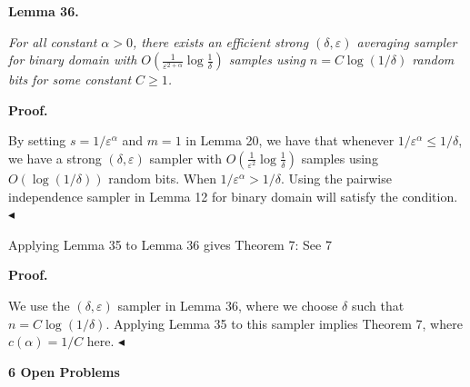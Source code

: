 \documentclass[10pt,a4paper]{article}
\begin{document}


\par\medskip\noindent\textbf{
\textbf{Lemma 36}\textbf{.}
}\par



\emph{For all constant $\alpha>0$,
there exists an efficient strong $(\delta,\varepsilon)$ averaging sampler for binary domain with $O(\frac{1}{\varepsilon^{2+\alpha}}\log\frac{1}{\delta})$ samples using $n=C\log(1/\delta)$ random bits for some constant $C\geq 1$.}\par






\par\medskip\noindent\textbf{Proof.}\par




By setting $s=1/\varepsilon^{\alpha}$ and $m=1$ in Lemma 20, we have that whenever $1/\varepsilon^{\alpha}\leq 1/\delta$, we have a strong $(\delta,\varepsilon)$ sampler with $O(\frac{1}{\varepsilon^{2}}\log\frac{1}{\delta})$ samples using $O(\log(1/\delta))$ random bits. When $1/\varepsilon^{\alpha}>1/\delta$. Using the pairwise independence sampler in Lemma 12 for binary domain will satisfy the condition.
$\blacktriangleleft$\par




Applying Lemma 35 to Lemma 36
gives Theorem 7:
See 7\par





\par\medskip\noindent\textbf{Proof.}\par




We use the $(\delta,\varepsilon)$ sampler in Lemma 36, where we choose $\delta$ such that $n=C\log(1/\delta)$.
Applying Lemma 35 to this sampler implies Theorem 7, where $c(\alpha)=1/C$ here.
$\blacktriangleleft$\par







\par\medskip\noindent\textbf{
6 Open Problems}\par
\end{document}
